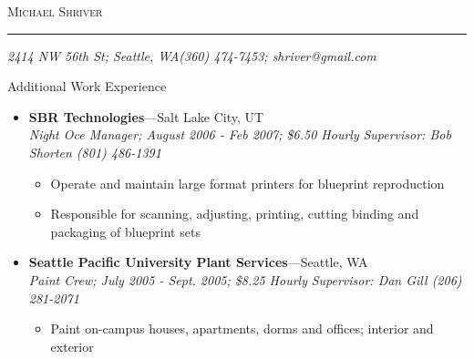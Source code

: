 \documentclass[11pt,oneside]{article}
\makeatletter
\newcommand{\name}{Michael Shriver}
\newcommand{\addr}{2414 NW 56th St; Seattle, WA}
\newcommand{\phone}{(360) 474-7453}
\newcommand{\email}{shriver@gmail.com}
\newcommand{\bigname}[1]{
	\begin{flushleft}\fontfamily{phv}\selectfont\Huge\scshape#1\end{flushleft}
}
\newenvironment{ressection}[1]{
	\vspace{4pt}
	{\fontfamily{phv}\selectfont\Large#1}
	\begin{itemize}
	\vspace{3pt}
}{
	\end{itemize}
}
\newcommand{\ressubitem}[1]{
	\vspace{-1pt}
	\item \begin{flushleft} #1 \end{flushleft}
}
\newenvironment{ressubsec}[4]{
	\item
	\textbf{#1}---#2 \\
	\textit{#3}
	\newline
	\textit{#4}
	\vspace{-2pt}
	\begin{itemize}
}{
	\end{itemize}
}
\makeatother
\begin{document}
 \selectfont

\bigname{\name}
\vspace{-8pt} \rule{\textwidth}{1pt}

\vspace{-1pt} {\small\itshape \addr \hfill \phone; \email}

\vspace{8 pt}


\begin{ressection}{Additional Work Experience}


	\begin{ressubsec}{SBR Technologies}{Salt Lake City, UT}{Night Oce Manager; August 2006 - Feb 2007; \$6.50 Hourly}{Supervisor: Bob Shorten (801) 486-1391}
		\ressubitem{Operate and maintain large format printers for blueprint reproduction}
		\ressubitem{Responsible for scanning, adjusting, printing, cutting binding and packaging of blueprint sets}
	\end{ressubsec}

	\begin{ressubsec}{Seattle Pacific University Plant Services}{Seattle, WA}{Paint Crew; July 2005 - Sept. 2005; \$8.25 Hourly}{Supervisor: Dan Gill (206) 281-2071}
		\ressubitem{Paint on-campus houses, apartments, dorms and offices; interior and exterior}
	\end{ressubsec}



\end{ressection}
\end{document}
